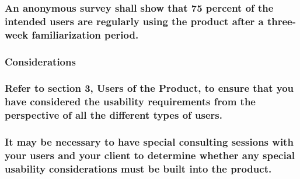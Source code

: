 \documentclass[
]{article}
\begin{document}
\hypertarget{an-anonymous-survey-shall-show-that-75-percent-of-the-intended-users-are-regularly-using-the-product-after-a-three-week-familiarization-period.}{%
\subsubsection{An anonymous survey shall show that 75 percent of the
intended users are regularly using the product after a three-week
familiarization
period.}\label{an-anonymous-survey-shall-show-that-75-percent-of-the-intended-users-are-regularly-using-the-product-after-a-three-week-familiarization-period.}}

\hypertarget{considerations-20}{%
\subsubsection{Considerations}\label{considerations-20}}

\hypertarget{refer-to-section-3-users-of-the-product-to-ensure-that-you-have-considered-the-usability-requirements-from-the-perspective-of-all-the-different-types-of-users.}{%
\subsubsection{Refer to section 3, Users of the Product, to ensure that
you have considered the usability requirements from the perspective of
all the different types of
users.}\label{refer-to-section-3-users-of-the-product-to-ensure-that-you-have-considered-the-usability-requirements-from-the-perspective-of-all-the-different-types-of-users.}}

\hypertarget{it-may-be-necessary-to-have-special-consulting-sessions-with-your-users-and-your-client-to-determine-whether-any-special-usability-considerations-must-be-built-into-the-product.}{%
\subsubsection{\texorpdfstring{It may be necessary to have special
consulting sessions with your users and your client to determine whether
any special usability considerations must be built into the product.
}{It may be necessary to have special consulting sessions with your users and your client to determine whether any special usability considerations must be built into the product. }}\label{it-may-be-necessary-to-have-special-consulting-sessions-with-your-users-and-your-client-to-determine-whether-any-special-usability-considerations-must-be-built-into-the-product.}}
\end{document}
